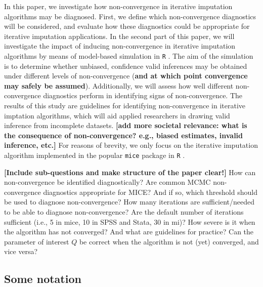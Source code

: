 \documentclass[Royal,times,sageh]{sagej}
\begin{document}
In this paper, we investigate how non-convergence in iterative
imputation algorithms may be diagnosed. First, we define which
non-convergence diagnostics will be considered, and evaluate how these
diagnostics could be appropriate for iterative imputation applications.
In the second part of this paper, we will investigate the impact of
inducing non-convergence in iterative imputation algorithms by means of
model-based simulation in \texttt{R} \citep{R}. The aim of the
simulation is to determine whether unbiased, confidence valid inferences
may be obtained under different levels of non-convergence (\textbf{and
at which point convergence may safely be assumed}). Additionally, we
will assess how well different non-convergence diagnostics perform in
identifying signs of non-convergence. The results of this study are
guidelines for identifying non-convergence in iterative imptation
algorithms, which will aid applied researchers in drawing valid
inference from incomplete datasets. \textbf{{[}add more societal
relevance: what is the consequence of non-convergence? e.g., biased
estimates, invalid inference, etc.{]}} For reasons of brevity, we only
focus on the iterative imputation algorithm implemented in the popular
\texttt{mice} package \citep{mice} in \texttt{R} \citep{R}.

\textbf{{[}Include sub-questions and make structure of the paper
clear!{]}} How can non-convergence be identified diagnostically? Are
common MCMC non-convergence diagnostics appropriate for MICE? And if so,
which threshold should be used to diagnose non-convergence? How many
iterations are sufficient/needed to be able to diagnose non-convergence?
Are the default number of iterations sufficient (i.e., 5 in mice, 10 in
SPSS and Stata, 30 in mi)? How severe is it when the algorithm has not
converged? And what are guidelines for practice? Can the parameter of
interest \(Q\) be correct when the algorithm is not (yet) converged, and
vice versa?

\hypertarget{some-notation}{%
\subsection{Some notation}\label{some-notation}}
\end{document}
